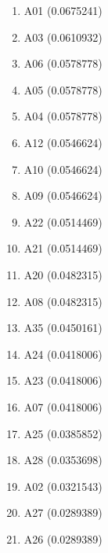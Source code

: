 \begin{enumerate}
\item A01 (0.0675241)
\item A03 (0.0610932)
\item A06 (0.0578778)
\item A05 (0.0578778)
\item A04 (0.0578778)
\item A12 (0.0546624)
\item A10 (0.0546624)
\item A09 (0.0546624)
\item A22 (0.0514469)
\item A21 (0.0514469)
\item A20 (0.0482315)
\item A08 (0.0482315)
\item A35 (0.0450161)
\item A24 (0.0418006)
\item A23 (0.0418006)
\item A07 (0.0418006)
\item A25 (0.0385852)
\item A28 (0.0353698)
\item A02 (0.0321543)
\item A27 (0.0289389)
\item A26 (0.0289389)
\end{enumerate}